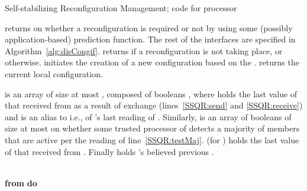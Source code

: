 \documentclass[11pt]{article}
\begin{document}
\begin{algorithm*}[t]

   \caption{Self-stabilizing Reconfiguration Management; code for processor }
\label{alg:SSQR}
\begin{footnotesize}




 returns  on whether a reconfiguration is required or not by using some (possibly application-based) prediction function.
The rest of the interfaces are specified in Algorithm~\ref{alg:disCongif}.
 returns  if a reconfiguration is not taking place, or  otherwise.
 initiates the creation of a new configuration based on the .
 returns the current local configuration.
\label{SSQR:interfaces}


 \label{SSQR:var}
 is an array of size at most , composed of booleans , where   holds the last value of  that  received from  as a result of exchange (lines~\ref{SSQR:send} and \ref{SSQR:receive}) and  is an alias to  i.e., of 's last reading of .
Similarly,  is an array of booleans of size at most  on whether some trusted processor of  detects a majority of members that are active per the reading of line~\ref{SSQR:testMaj}.
 (for ) holds the last value of  that  received from . 
Finally  holds 's believed previous .
\\

 \\
 \;\label{SSQR:defCore}
 \lForEach{}{}
 \Begin{
\If{\label{SSQR:isPartpnt}}{
\; \label{SSQR:readConfig}

\;\label{SSQR:ownFlagReset}
\lIf{  }{\label{SSQR:configChanged}
}\label{SSQR:flagsResetAll}

\If{}{ \label{SSQR:configChanging}

  \; \label{SSQR:updatePrev}

\lIf{}{} \label{SSQR:testMaj}
\uIf{      \label{SSQR:checkNoMajCore}}{
\; \label{SSQR:noMajTrigger}
\;\label{SSQR:noMajResetAll}
}

\ElseIf{  \label{SSQR:gracefulQreconf}}{
\; \label{SSQR:needReconfTrigger}
\;\label{SSQR:needReconfResetAll}
}  

}

\lForEach{  }{} \label{SSQR:send}
}
}

  {\bf from}  \textbf{do} \label{SSQR:receive} \lIf{}{}\label{SSQR:receiveStore}





\end{footnotesize}
\end{algorithm*}
\setlength{\textfloatsep}{5pt}
\end{document}
